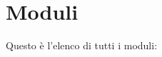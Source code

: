 \section{Moduli}
Questo è l'elenco di tutti i moduli\+:\begin{DoxyCompactList}
\item {}
\begin{DoxyCompactList}
\item {}
\end{DoxyCompactList}
\end{DoxyCompactList}
